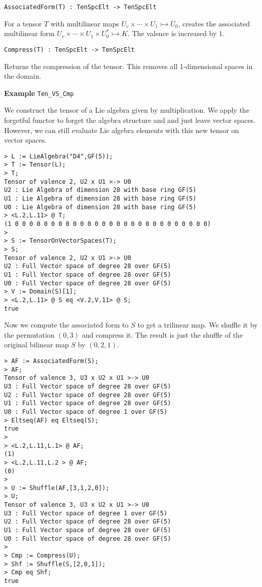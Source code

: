 \color{blue}
{\small \begin{verbatim}
AssociatedForm(T) : TenSpcElt -> TenSpcElt
\end{verbatim} }
\color{black}

For a tensor $T$ with multilinear maps $U_v\times \cdots \times U_1\rightarrowtail U_0$,
creates the associated multilinear form
$U_v\times\cdots\times U_1\times U_0^*\rightarrowtail K$.  The valence is increased
by $1$.

\color{blue}
{\small \begin{verbatim}
Compress(T) : TenSpcElt -> TenSpcElt
\end{verbatim} }
\color{black}

Returns the compression of the tensor. This removes all 1-dimensional spaces 
in the domain.

\begin{framed} {\bf Example} {\tt Ten\_VS\_Cmp}\\
{\small We construct the tensor of a Lie algebra given by multiplication. 
We apply the forgetful functor to forget the algebra structure and and just leave vector spaces.
However, we can still evaluate Lie algebra elements with this new tensor on vector spaces.
\begin{lstlisting}[frame=single,basicstyle=\ttfamily\color{black!30!
teal},backgroundcolor=\color{white!70!gray}]
> L := LieAlgebra("D4",GF(5));
> T := Tensor(L); 
> T;
Tensor of valence 2, U2 x U1 >-> U0
U2 : Lie Algebra of dimension 28 with base ring GF(5)
U1 : Lie Algebra of dimension 28 with base ring GF(5)
U0 : Lie Algebra of dimension 28 with base ring GF(5)
> <L.2,L.11> @ T;
(1 0 0 0 0 0 0 0 0 0 0 0 0 0 0 0 0 0 0 0 0 0 0 0 0 0 0 0)
> 
> S := TensorOnVectorSpaces(T);
> S;
Tensor of valence 2, U2 x U1 >-> U0
U2 : Full Vector space of degree 28 over GF(5)
U1 : Full Vector space of degree 28 over GF(5)
U0 : Full Vector space of degree 28 over GF(5)
> V := Domain(S)[1];
> <L.2,L.11> @ S eq <V.2,V.11> @ S;
true
\end{lstlisting}
Now we compute the associated form to $S$ to get a trilinear map. 
We shuffle it by the permutation $(0,3)$ and compress it.
The result is just the shuffle of the original bilinear map $S$ by $(0,2,1)$.
\begin{lstlisting}[frame=single,basicstyle=\ttfamily\color{black!30!
teal},backgroundcolor=\color{white!70!gray}]
> AF := AssociatedForm(S);
> AF;
Tensor of valence 3, U3 x U2 x U1 >-> U0
U3 : Full Vector space of degree 28 over GF(5)
U2 : Full Vector space of degree 28 over GF(5)
U1 : Full Vector space of degree 28 over GF(5)
U0 : Full Vector space of degree 1 over GF(5)
> Eltseq(AF) eq Eltseq(S);
true
> 
> <L.2,L.11,L.1> @ AF;
(1)
> <L.2,L.11,L.2 > @ AF;
(0)
> 
> U := Shuffle(AF,[3,1,2,0]);
> U;
Tensor of valence 3, U3 x U2 x U1 >-> U0
U3 : Full Vector space of degree 1 over GF(5)
U2 : Full Vector space of degree 28 over GF(5)
U1 : Full Vector space of degree 28 over GF(5)
U0 : Full Vector space of degree 28 over GF(5)
> 
> Cmp := Compress(U);
> Shf := Shuffle(S,[2,0,1]);
> Cmp eq Shf;
true
\end{lstlisting}
}
\end{framed}

